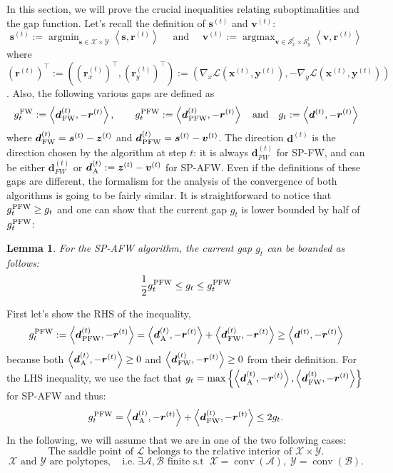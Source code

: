 \documentclass[twoside]{article}
\makeatletter
\renewcommand{\L}{\mathcal{L}}
\newcommand{\X}{\mathcal{X}}
\newcommand{\Y}{\mathcal{Y}}
\newcommand{\M}{\X \times \Y}
\newcommand{\prodscal}[2]{\left\langle#1,#2\right\rangle}
\newcommand{\s}{\bm{s}}
\newcommand{\xt}{\bm{x}^{(t)}}
\newcommand{\zt}{\bm{z}^{(t)}}
\newcommand{\st}{\bm{s}^{(t)}}
\newcommand{\vt}{\bm{v}^{(t)}}
\newcommand{\dt}{\bm{d}^{(t)}}
\newcommand{\rt}{\r^{(t)}}
\newcommand{\yt}{\bm{y}^{(t)}}
\renewcommand{\SS}{ \bm{S}}
\newcommand{\gap}{g_{t}}
\newcommand{\leqnomode}{\tagsleft@true\let\veqno\@@leqno}
\newcommand{\reqnomode}{\tagsleft@false\let\veqno\@@eqno}
\newtheorem{lemma}[definition]{Lemma}
\DeclareMathOperator*{\conv}{conv}
\DeclareMathOperator*{\argmin}{\arg\min}
\DeclareMathOperator*{\argmax}{\arg\max}
\newcommand{\FW}{{\hspace{0.05em}\textnormal{FW}}}
\newcommand{\PW}{{\hspace{0.05em}\textnormal{PFW}}}
\newcommand{\away}{{\hspace{0.05em}\textnormal{A}}}
\newcommand{\vv}{\bm{v}} %
\newcommand{\A}{\mathcal{A}}
\newcommand{\B}{\mathcal{B}}
\renewcommand{\SS}{\mathcal{S}}
\renewcommand{\r}{\bm{r}}
\newcommand{\0}{\mathbf{0}} %
\makeatother
\begin{document}
  In this section, we will prove the crucial inequalities relating suboptimalities and the gap function.
  Let's recall the definition of $\st$ and $\vt$:
    \begin{equation}\st:=  \argmin_{\s \in \M}
         \prodscal{\s}{
       \rt}
    \quad \text{  and } \quad 
    \vt:=  \argmax_{\vv \in \SS^{t}_x\times \SS^{t}_y}
         \prodscal{\vv}{
        \rt}
         \end{equation}
  where $(\rt)^\top := ( (\rt_x)^\top, (\rt_y)^\top ) :=  \left(
        \nabla_x \L(\xt,\yt),
         -\nabla_y \L(\xt,\yt)
         \right)$. 
  Also, the following various gaps are defined as 
    \begin{equation}\label{eq:gaps} 
    \gap^{\FW} :=\prodscal{\dt_{\FW}}{-\rt} 
    , \qquad
    \gap^{\PW} :=\prodscal{\dt_{\PW}}{-\rt}
    \quad \text{and} \quad
    \gap := \prodscal{\dt}{-\rt}
    \end{equation}
  where $\dt_{\FW} = \st - \zt$ and $\dt_{\PW} = \st - \vt$. The direction $\dt$ is the direction chosen by the algorithm at step $t$: it is always $\dt_{FW}$ for SP-FW, and can be either $\dt_{FW}$ or $\dt_{\away} := \zt - \vt$ for SP-AFW. Even if the definitions of these gaps are different, the formalism for the analysis of the convergence of both algorithms is going to be fairly similar.
  It is straightforward to notice that $\gap^{\PW} \geq \gap$ and one can show that the current gap $\gap$ is lower bounded by half of $\gap^{\PW}$:
  \begin{lemma}\label{lemma:gap_FW_PW}
     For the SP-AFW algorithm, the current gap $\gap$ can be bounded as follows:
     \begin{equation}
      \frac{1}{2} \gap^{\PW} \leq \gap \leq \gap^{\PW}
     \end{equation}
   \end{lemma} 
   \proof
    First let's show the RHS of the inequality, 
    \begin{equation}
      \gap^{\PW} := \prodscal{\dt_{\PW}}{-\rt} = \prodscal{\dt_{\away}}{-\rt} + \prodscal{\dt_{\FW}}{-\rt} \geq \prodscal{\dt}{-\rt}
    \end{equation}
    because both $\prodscal{\dt_{\away}}{-\rt}\geq 0$ and $ \prodscal{\dt_{\FW}}{-\rt} \geq 0$ from their definition.
    For the LHS inequality, we use the fact that $\gap = \max \left\{ \prodscal{\dt_{\away}}{-\rt} , \prodscal{\dt_{\FW}}{-\rt} \right\}$ for SP-AFW and thus:
    \begin{equation}
       \gap^{\PW} = \prodscal{\dt_{\away}}{-\rt} + \prodscal{\dt_{\FW}}{-\rt} \leq 2 \gap .
    \end{equation}
   \endproof
   In the following, we will assume that we are in one of the two following cases: 
   \leqnomode
  \begin{equation}
    \label{case:1}
    \text{The saddle point of } \L \text{ belongs to the relative interior of } \M.
    \tag{I}
  \end{equation}
  \begin{equation}
    \label{case:2}
    \X \text{ and } \Y \text{ are polytopes}, \quad \text{i.e.} \; \exists \A, \B \text{ finite s.t}\;\; \X = \conv(\A), \; \Y = \conv(\B).
    \tag{P}
  \end{equation}
  \reqnomode
\end{document}
